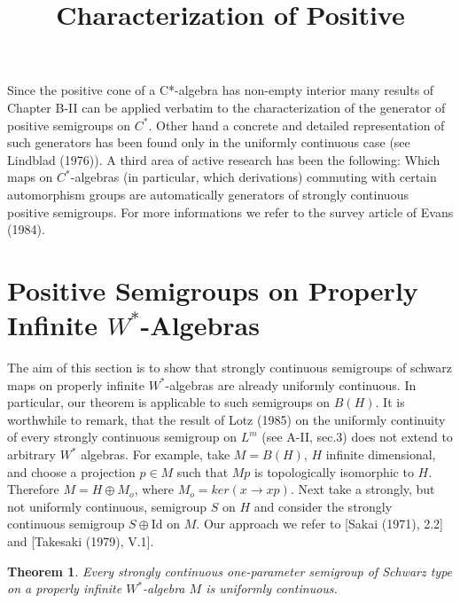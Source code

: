 \documentclass{article}
\title{Characterization of Positive}
\author{}
\date{}
\theoremstyle{plain} %
\newtheorem{theorem}{Theorem}[section]
\theoremstyle{definition} %
\begin{document}
\maketitle

Since the positive cone of a C*-algebra has non-empty interior many results of Chapter B-II can be applied verbatim to the characterization of the generator of positive semigroups on $C^*$.
Other hand a concrete and detailed representation of such generators has been found only in the uniformly continuous case (see Lindblad (1976)).
A third area of active research has been the following: Which maps on $C^*$-algebras (in particular, which derivations) commuting with certain automorphism groups are automatically generators of strongly continuous positive semigroups.
For more informations we refer to the survey article of Evans (1984).

\section{Positive Semigroups on Properly Infinite $ W^{*} $-Algebras}

The aim of this section is to show that strongly continuous semigroups of schwarz maps on properly infinite $W^*$-algebras are already uniformly continuous.
In particular, our theorem is applicable to such semigroups on $B(H)$.
It is worthwhile to remark, that the result of Lotz (1985) on the uniformly continuity of every strongly continuous semigroup on $L^m$ (see A-II, sec.3) does not extend to arbitrary $W^*$ algebras.
For example, take $M=B(H)$, $H$ infinite dimensional, and choose a projection $p \in M$ such that $Mp$ is topologically isomorphic to $H$.
Therefore $M=H \oplus M_o$, where $M_o=ker(x \rightarrow xp)$.
Next take a strongly, but not uniformly continuous, semigroup $S$ on $H$ and consider the strongly continuous semigroup $S \oplus \text{Id}$ on $M$.
Our approach we refer to [Sakai (1971), 2.2] and [Takesaki (1979), V.1].

\begin{theorem}
Every strongly continuous one-parameter semigroup of Schwarz type on a properly infinite $W^*$-algebra $M$ is uniformly continuous.
\end{theorem}
\end{document}
